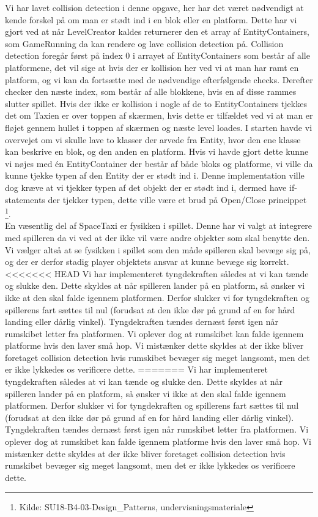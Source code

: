 Vi har lavet collision detection i denne opgave, her har det været nødvendigt at kende forskel på om man er stødt ind i en blok eller en platform. Dette har vi gjort ved at når LevelCreator kaldes returnerer den et array af EntityContainers, som GameRunning da kan rendere og lave collision detection på. Collision detection foregår først på index 0 i arrayet af EntityContainers som består af alle platformene, det vil sige at hvis der er kollision her ved vi at man har ramt en platform, og vi kan da fortsætte med de nødvendige efterfølgende checks. Derefter checker den næste index, som består af alle blokkene, hvis en af disse rammes slutter spillet. Hvis der ikke er kollision i nogle af de to EntityContainers tjekkes det om Taxien er over toppen af skærmen, hvis dette er tilfældet ved vi at man er fløjet gennem hullet i toppen af skærmen og næste level loades. I starten havde vi overvejet om vi skulle lave to klasser der arvede fra Entity, hvor den ene klasse kan beskrive en blok, og den anden en platform. Hvis vi havde gjort dette kunne vi nøjes med én EntityContainer der består af både bloks og platforme, vi ville da kunne tjekke typen af den Entity der er stødt ind i. Denne implementation ville dog kræve at vi tjekker typen af det objekt der er stødt ind i, dermed have if-statements der tjekker typen, dette ville være et brud på Open/Close princippet \footnote{Kilde: SU18-B4-03-Design\_Patterns, undervisningsmateriale}.\\

En væsentlig del af SpaceTaxi er fysikken i spillet. Denne har vi valgt at integrere med spilleren da vi ved at der ikke vil være andre objekter som skal benytte den. Vi vælger altså at se fysikken i spillet som den måde spilleren skal bevæge sig på, og der er derfor stadig player objektets ansvar at kunne bevæge sig korrekt.\\
<<<<<<< HEAD
Vi har implementeret tyngdekraften således at vi kan tænde og slukke den. Dette skyldes at når spilleren lander på en platform, så ønsker vi ikke at den skal falde igennem platformen. Derfor slukker vi for tyngdekraften og spillerens fart sættes til nul (forudsat at den ikke dør på grund af en for hård landing eller dårlig vinkel). Tyngdekraften tændes dernæst først igen når rumskibet letter fra platformen. Vi oplever dog at rumskibet kan falde igennem platforme hvis den laver små hop. Vi mistænker dette skyldes at der ikke bliver foretaget collision detection hvis rumskibet bevæger sig meget langsomt, men det er ikke lykkedes os verificere dette.
=======
Vi har implementeret tyngdekraften således at vi kan tænde og slukke den. Dette skyldes at når spilleren lander på en platform, så ønsker vi ikke at den skal falde igennem platformen. Derfor slukker vi for tyngdekraften og spillerens fart sættes til nul (forudsat at den ikke dør på grund af en for hård landing eller dårlig vinkel). Tyngdekraften tændes dernæst først igen når rumskibet letter fra platformen. Vi oplever dog at rumskibet kan falde igennem platforme hvis den laver små hop. Vi mistænker dette skyldes at der ikke bliver foretaget collision detection hvis rumskibet bevæger sig meget langsomt, men det er ikke lykkedes os verificere dette.\\

